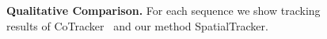 \begin{figure}


    \caption{\textbf{Qualitative Comparison.} For each sequence we show tracking results of CoTracker~\cite{cotracker} and our method SpatialTracker.} 
    \vspace{-2mm}
\label{fig:exp}
\end{figure}